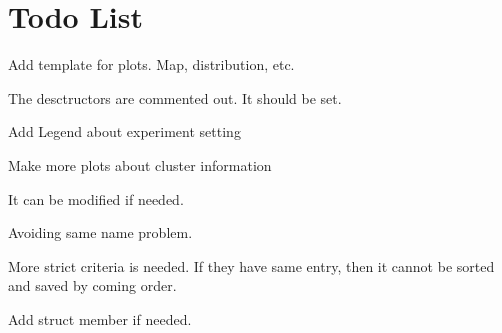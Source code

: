 \chapter{Todo List}
\hypertarget{todo}{}\label{todo}

\begin{DoxyRefList}
\item[Class \doxylink{classTAnalyser}{TAnalyser} ]\label{todo__todo000001}%
%
Add template for plots. Map, distribution, etc.  
\item[Member \doxylink{classTAnalyser_a233a02507d96d20b0ec465118c157620}{TAnalyser\+::\texorpdfstring{$\sim$}{\string~}\+TAnalyser} ()]\label{todo__todo000002}%
%
The desctructors are commented out. It should be set.  
\item[Class \doxylink{classTClusterAnalyser}{TCluster\+Analyser} ]\label{todo__todo000009}%
%
Add Legend about experiment setting 



Make more plots about cluster information  
\item[Class \doxylink{classTClusterShape}{TCluster\+Shape} ]\label{todo__todo000004}%
%
It can be modified if needed.  
\item[Member \doxylink{classTClusterShape_a0bf1d1638ef8e81de7e1a6e5b8fbb676}{TCluster\+Shape\+::cluster\+Map} (const \doxylink{classTMatrix2D}{TMatrix2\+D$<$ int $>$} \texorpdfstring{$\ast$}{*}cluster\+Matrix)]\label{todo__todo000008}%
%
Avoiding same name problem.  
\item[Member \doxylink{classTClusterShape_a8f9122608ad8f9a1184a4ec1cc5eb65c}{TCluster\+Shape\+::identify\+Shapes} ()]\label{todo__todo000006}%
%
  
\item[Member \doxylink{classTClusterShape_ae06f2f873cccf6036d05c1210122fed8}{TCluster\+Shape\+::sort\+Shapes} (bool descend=true)]\label{todo__todo000007}%
%
More strict criteria is needed. If they have same entry, then it cannot be sorted and saved by coming order.  
\item[Member \doxylink{classTClusterShape_ad7d57433db926c90ae84483bc060e675}{TCluster\+Shape\+::TCluster\+Shape} ()]\label{todo__todo000005}%
%
  
\item[Struct \doxylink{structTShapeInfo}{TShape\+Info} ]\label{todo__todo000003}%
%
Add struct member if needed. 
\end{DoxyRefList}